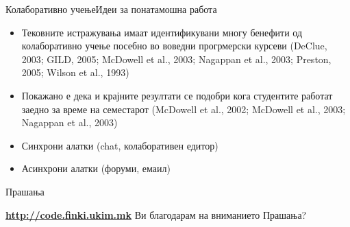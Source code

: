 \begin{frame}{Колаборативно учење}{Идеи за понатамошна работа}
\begin{itemize}
  \item Тековните истражувања имаат идентификувани многу бенефити од
  колаборативно учење посебно во воведни прогрмерски курсеви (DeClue, 2003; GILD, 2005; McDowell et al.,
2003; Nagappan et al., 2003; Preston, 2005; Wilson et al., 1993)
\item Покажано е дека и крајните резултати се подобри кога студентите работат
заедно за време на семестарот (McDowell et al., 2002; McDowell et al., 2003; Nagappan et al.,
2003)
\item Синхрони алатки (chat, колаборативен едитор)
\item Асинхрони алатки (форуми, емаил)
\end{itemize}
\end{frame}


\begin{frame}{Прашања}{}
    \begin{center}
    \Large{
    \href{http://code.finki.ukim.mk/}{\textbf{http://code.finki.ukim.mk}}}
    \vfill
    \huge{Ви благодарам на вниманието}
    \vfill    
    \Huge{Прашања?}
    \end{center}
\end{frame}







